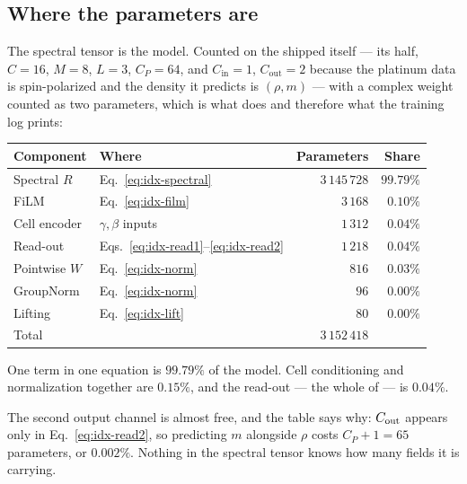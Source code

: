 \subsection{Where the parameters are}

The spectral tensor is the model. Counted on the shipped
 itself --- its  half, $C=16$, $M=8$,
$L=3$, $C_P=64$, and $C_{\mathrm{in}}=1$, $C_{\mathrm{out}}=2$ because the
platinum data is spin-polarized and the density it predicts is
$(\rho, m)$ --- with a complex weight counted as two parameters, which is what
 does and therefore what the training log prints:

\begin{center}
\begin{tabular}{@{}llrr@{}}
\toprule
Component & Where & Parameters & Share \\
\midrule
Spectral $R$    & Eq.~\eqref{eq:idx-spectral} & $3\,145\,728$ & $99.79\%$ \\
FiLM            & Eq.~\eqref{eq:idx-film}     & $3\,168$      & $0.10\%$ \\
Cell encoder    & $\gamma,\beta$ inputs       & $1\,312$      & $0.04\%$ \\
Read-out        & Eqs.~\eqref{eq:idx-read1}--\eqref{eq:idx-read2} & $1\,218$ & $0.04\%$ \\
Pointwise $W$   & Eq.~\eqref{eq:idx-norm}     & $816$         & $0.03\%$ \\
GroupNorm       & Eq.~\eqref{eq:idx-norm}     & $96$          & $0.00\%$ \\
Lifting         & Eq.~\eqref{eq:idx-lift}     & $80$          & $0.00\%$ \\
\midrule
Total           &                             & $3\,152\,418$ & \\
\bottomrule
\end{tabular}
\end{center}

One term in one equation is $99.79\%$ of the model. Cell conditioning and
normalization together are $0.15\%$, and the read-out --- the whole of
 --- is $0.04\%$.

The second output channel is almost free, and the table says why: $C_{\rm out}$
appears only in Eq.~\eqref{eq:idx-read2}, so predicting $m$ alongside $\rho$
costs $C_P + 1 = 65$ parameters, or $0.002\%$. Nothing in the spectral tensor
knows how many fields it is carrying.

